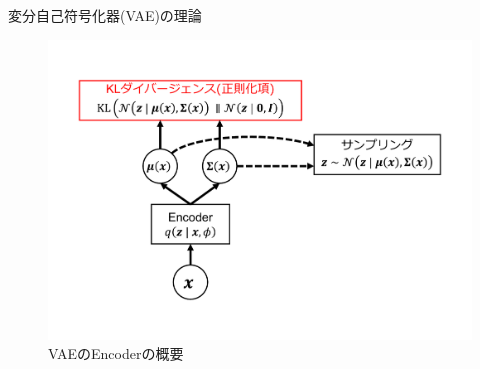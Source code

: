 \documentclass[dvipdfmx,notheorems,t]{beamer}
\begin{document}
\begin{frame}{変分自己符号化器(VAE)の理論}
	
\begin{figure}[h]
	\centering
	\includegraphics[keepaspectratio,scale=0.3,clip,trim=1cm 1cm 1cm 1cm]{vae-encoder-architecture.pdf}
	\caption{VAEのEncoderの概要}
	\label{fig:vae-encoder-architecture}
\end{figure}

\end{frame}
\end{document}

